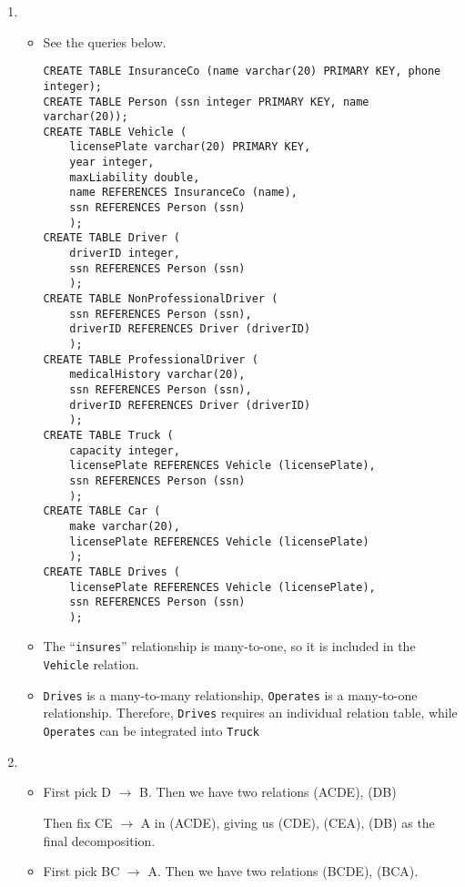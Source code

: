 \documentclass[10pt]{article}
\begin{document}
\begin{enumerate}[label=\textbf{\arabic*.}, listparindent=0.0em, itemsep=1em]
\begin{enumerate}[listparindent=0.0em, itemsep=1em]
\begin{center}
\begin{tikzpicture}
        \end{tikzpicture}
    \end{center}
    \end{enumerate}
    \item 
        \begin{itemize}
            \item See the queries below.
            \begin{lstlisting}
CREATE TABLE InsuranceCo (name varchar(20) PRIMARY KEY, phone integer);
CREATE TABLE Person (ssn integer PRIMARY KEY, name varchar(20));
CREATE TABLE Vehicle (
    licensePlate varchar(20) PRIMARY KEY, 
    year integer,
    maxLiability double,
    name REFERENCES InsuranceCo (name), 
    ssn REFERENCES Person (ssn)
    );
CREATE TABLE Driver (
    driverID integer, 
    ssn REFERENCES Person (ssn)
    );
CREATE TABLE NonProfessionalDriver (
    ssn REFERENCES Person (ssn), 
    driverID REFERENCES Driver (driverID)
    );
CREATE TABLE ProfessionalDriver (
    medicalHistory varchar(20),
    ssn REFERENCES Person (ssn), 
    driverID REFERENCES Driver (driverID)
    );
CREATE TABLE Truck (
    capacity integer,
    licensePlate REFERENCES Vehicle (licensePlate),
    ssn REFERENCES Person (ssn)
    );
CREATE TABLE Car (
    make varchar(20),
    licensePlate REFERENCES Vehicle (licensePlate)
    );
CREATE TABLE Drives (
    licensePlate REFERENCES Vehicle (licensePlate),
    ssn REFERENCES Person (ssn)
    );
            \end{lstlisting}
        \item The ``\texttt{insures}'' relationship is many-to-one, so it is included in the \texttt{Vehicle} relation. 
        \item \texttt{Drives} is a many-to-many relationship, \texttt{Operates} is a many-to-one relationship. Therefore,
           \texttt{Drives} requires an individual relation table, while \texttt{Operates} can be integrated into \texttt{Truck}
        \end{itemize}
    \item 
        \begin{itemize}
            \item First pick D $\to$ B. Then we have two relations (ACDE), (DB) \par
                  Then fix CE $\to$ A in (ACDE), giving us (CDE), (CEA), (DB) as the final decomposition.
            \item First pick BC $\to$ A. Then we have two relations (BCDE), (BCA). \par

\end{itemize}
\end{enumerate}
\end{document}
